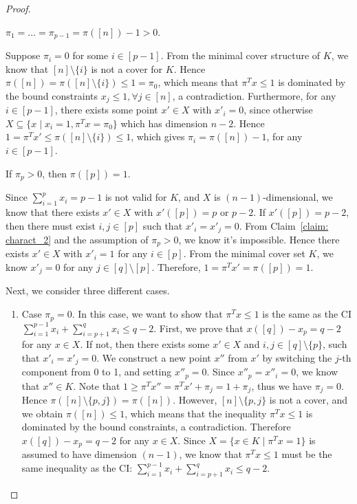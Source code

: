 \begin{appendices}
\begin{proof}
\begin{claim}
\label{claim: charact_2}
$\pi_1 = \ldots = \pi_{p-1} = \pi([n]) - 1> 0$.
\end{claim}
\begin{cpf}
Suppose $\pi_i = 0$ for some $i \in [p-1]$. From the minimal cover structure of $K$, we know that $[n] \setminus \{i\}$ is not a cover for $K$. 
Hence $\pi([n]) = \pi([n] \setminus \{i\}) \leq 1 = \pi_0$, which means that $\pi^T x \leq 1$ is dominated by the bound constraints $x_j \leq 1, \forall j \in [n]$, a contradiction.
Furthermore, for any $i \in [p-1]$, there exists some point $x' \in X$ with $x'_i = 0$, since otherwise $X \subseteq \{x \mid x_i = 1, \pi^T x = \pi_0\}$ which has dimension $n-2$. Hence $1 = \pi^T x' \leq \pi([n] \setminus \{i\}) \leq 1$, which gives $\pi_i = \pi([n]) - 1$, for any $i \in [p-1]$. 
\end{cpf}

\begin{claim}
\label{claim: charact_3}
If $\pi_p > 0$, then $\pi([p]) = 1$.
\end{claim}

\begin{cpf}
Since $\sum_{i=1}^p x_i = p-1$ is not valid for $K$, and $X$ is $(n-1)$-dimensional, we know that there exists $x' \in X$ with $x'([p]) = p$ or $p-2$. 
If $x'([p]) = p-2$, then there must exist $i,j \in [p]$ such that $x'_i = x'_j = 0$. From Claim~\ref{claim: charact_2} and the assumption of $\pi_p > 0$, we know it's impossible. 
Hence there exists $x' \in X$ with $x'_i = 1$ for any $i \in [p]$. 
From the minimal cover set $K$, we know $x'_j = 0$ for any $j \in [q] \setminus [p]$.
Therefore, $1 = \pi^T x' = \pi([p]) = 1$.
\end{cpf}

Next, we consider three different cases.
\begin{enumerate}
\item Case $\pi_p = 0$.
In this case, we want to show that $\pi^T x \leq 1$ is the same as the CI $\sum_{i=1}^{p-1} x_i + \sum_{i=p+1}^q x_i \leq q-2$.
First, we prove that $x([q]) - x_p = q-2$ for any $x \in X$. If not, then there exists some $x' \in X$ and $i,j \in [q] \setminus \{p\}$, such that $x'_i = x'_j = 0$. 
We construct a new point $x''$ from $x'$ by switching the $j$-th component from 0 to 1, and setting $x''_p = 0$.
Since $x''_p = x''_i = 0$, we know that $x'' \in K$.
Note that $1 \geq \pi^T x'' = \pi^T x' + \pi_j = 1+\pi_j$, thus we have $\pi_j = 0$. 
Hence $\pi([n] \setminus \{p, j\}) = \pi([n])$. 
However, $[n] \setminus \{p, j\}$ is not a cover, and we obtain $\pi([n]) \leq 1$, which means that the inequality $\pi^T x \leq 1$ is dominated by the bound constraints, a contradiction.
Therefore $x([q]) - x_p = q-2$ for any $x \in X$. 
Since $X = \{x \in K \mid \pi^T x = 1\}$ is assumed to have dimension $(n-1)$, we know that $\pi^T x \leq 1$ must be the same inequality as the CI: $\sum_{i=1}^{p-1} x_i + \sum_{i=p+1}^q x_i \leq q-2$.


\end{enumerate}
\end{proof}
\end{appendices}
